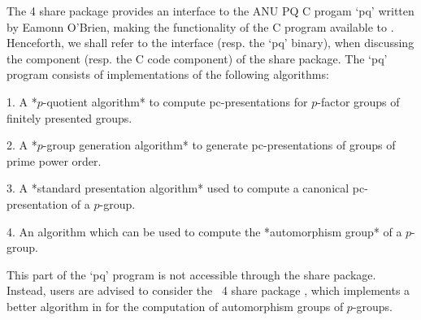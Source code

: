 

The {\GAP} 4 share package {\ANUPQ} provides an interface to the ANU PQ C
progam `pq' written by Eamonn O'Brien, making the functionality of the  C
program available to {\GAP}. Henceforth, we shall refer to  the  {\ANUPQ}
interface (resp. the `pq' binary), when discussing the  {\GAP}  component
(resp. the C code component) of the  {\ANUPQ}  share  package.  The  `pq'
program consists of implementations of the following algorithms:

\beginlist

\item{1.}
A *$p$-quotient algorithm* to  compute  pc-presentations  for  $p$-factor
groups of finitely presented groups.


\item{2.} 
A *$p$-group generation algorithm* to generate pc-presentations of groups
of prime power order.


\item{3.}
A  *standard  presentation  algorithm*  used  to  compute   a   canonical
pc-presentation of a $p$-group.


\item{4.} 
An algorithm which can be used to compute the *automorphism group*  of  a
$p$-group.

\item{}
This part of the `pq' program is  not  accessible  through  the  {\ANUPQ}
share package. Instead, users are advised to consider the {\GAP}~4  share
package {\AutPGrp}, which implements a better algorithm in {\GAP} for the
computation of automorphism groups of $p$-groups.

